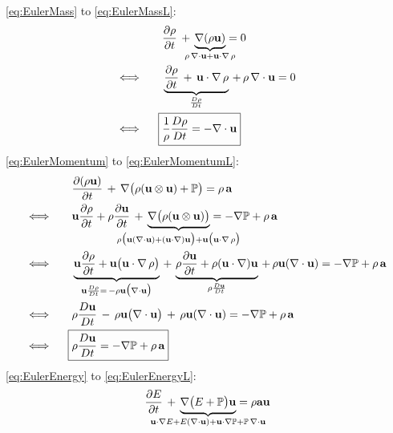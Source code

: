 \begin{itemize}
 \eqref{eq:EulerMass} to \eqref{eq:EulerMassL}:
 \vspace{-0.5cm}
 \begin{align*}
  &\frac{\partial\rho}{\partial t} \,+\, \underbrace{ \nabla(\rho\textbf{u}) }_{\mathclap{\rho\,\nabla\cdot\textbf{u} + \textbf{u}\cdot\nabla\,\rho}} = 0 \\
  \Longleftrightarrow\qquad
  &\underbrace{ \frac{\partial\rho}{\partial t} \,+\, \textbf{u}\cdot\nabla\,\rho }_{\frac{D\rho}{Dt}} \,+\, \rho\,\nabla\cdot\textbf{u} = 0 \\
  \Longleftrightarrow\qquad\!\!
  \Aboxed{&\frac{1}{\rho}\frac{D\rho}{Dt} = -\nabla\cdot\textbf{u}}
 \end{align*}
 \eqref{eq:EulerMomentum} to \eqref{eq:EulerMomentumL}:
 \vspace{-0.5cm}
 \begin{align*}
  &\frac{\partial(\rho \textbf{u})}{\partial t} \,+\, \nabla \big( \rho(\textbf{u}\otimes\textbf{u}) + \mathbb{P} \big) = \rho\,\textbf{a} \\
  \Longleftrightarrow\qquad
  &\textbf{u}\frac{\partial\rho}{\partial t} + \rho\frac{\partial\textbf{u}}{\partial t} \,+\, \underbrace{ \nabla\big(\rho(\textbf{u}\otimes\textbf{u})\big) }_{\mathclap{\rho\big(\textbf{u}(\nabla\cdot\textbf{u}) + (\textbf{u}\cdot\nabla)\textbf{u}\big) + \textbf{u}\big(\textbf{u}\cdot\nabla\,\rho\big)}} = -\nabla\mathbb{P} + \rho\,\textbf{a} \\
  \Longleftrightarrow\qquad
  &\underbrace{ \textbf{u}\frac{\partial\rho}{\partial t} + \textbf{u}\big(\textbf{u}\cdot\nabla\,\rho\big) }_{\mathclap{\textbf{u}\frac{D\rho}{Dt} = \,-\rho\textbf{u}\big(\nabla\cdot\textbf{u}\big)}} \,+\, \underbrace{ \rho\frac{\partial\textbf{u}}{\partial t} + \rho(\textbf{u}\cdot\nabla)\textbf{u} }_{\mathclap{\rho\frac{D\textbf{u}}{Dt}}} \,+\, \rho\textbf{u}(\nabla\cdot\textbf{u}) = -\nabla\mathbb{P} + \rho\,\textbf{a} \\
  \Longleftrightarrow\qquad
  &\rho\frac{D\textbf{u}}{Dt} \,-\, \rho\textbf{u}\big(\nabla\cdot\textbf{u}\big) \,+\, \rho\textbf{u}(\nabla\cdot\textbf{u}) = -\nabla\mathbb{P} + \rho\,\textbf{a} \\
  \Longleftrightarrow\qquad\!\!
  \Aboxed{&\rho\frac{D\textbf{u}}{Dt} = -\nabla\mathbb{P} + \rho\,\textbf{a}}
 \end{align*}
 \eqref{eq:EulerEnergy} to \eqref{eq:EulerEnergyL}:
 \begin{align*}
  &\frac{\partial E}{\partial t} \,+\, \underbrace{ \nabla\big(E+\mathbb{P}\big)\textbf{u} }_{\mathclap{\textbf{u}\cdot\nabla E + E(\nabla\cdot\textbf{u}) + \textbf{u}\cdot\nabla\mathbb{P} + \mathbb{P}\,\nabla\cdot\textbf{u}}} = \rho\textbf{a}\textbf{u} \\

\end{align*}
\end{itemize}
